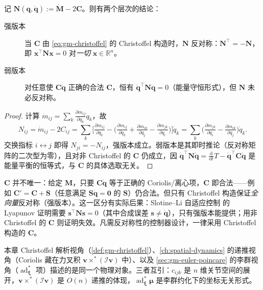 \begin{theorem}\label{thm:gm-skew}
记 $\mathbf N(\mathbf q,\dot{\mathbf q}):=\dot{\mathbf M}-2\mathbf C$。则有两个层次的结论：
\begin{description}
  \item[强版本] 当 $\mathbf C$ 由 \cref{eq:gm-christoffel} 的 Christoffel 构造时，$\mathbf N$ 反对称：$\mathbf N^\top=-\mathbf N$，即 $\mathbf x^\top\mathbf N\mathbf x=0$ 对\emph{一切} $\mathbf x\in\mathbb R^n$。
  \item[弱版本] 对任意使 $\mathbf C\dot{\mathbf q}$ 正确的合法 $\mathbf C$，恒有 $\dot{\mathbf q}^\top\mathbf N\dot{\mathbf q}=0$（能量守恒形式），但 $\mathbf N$ 未必反对称。
\end{description}
\end{theorem}

\begin{proof}
计算 $\dot m_{ij}=\sum_k\tfrac{\partial m_{ij}}{\partial q_k}\dot q_k$，故
\[
N_{ij}=\dot m_{ij}-2C_{ij}=\sum_k\Big[\tfrac{\partial m_{ij}}{\partial q_k}-\big(\tfrac{\partial m_{ij}}{\partial q_k}+\tfrac{\partial m_{ik}}{\partial q_j}-\tfrac{\partial m_{jk}}{\partial q_i}\big)\Big]\dot q_k=\sum_k\Big(\tfrac{\partial m_{jk}}{\partial q_i}-\tfrac{\partial m_{ik}}{\partial q_j}\Big)\dot q_k.
\]
交换指标 $i\leftrightarrow j$ 即得 $N_{ji}=-N_{ij}$，强版本成立。弱版本是其即时推论（反对称矩阵的二次型为零），且对非 Christoffel 的 $\mathbf C$ 仍成立，因 $\dot{\mathbf q}^\top\mathbf N\dot{\mathbf q}=\tfrac{\mathrm d}{\mathrm dt}T-\dot{\mathbf q}^\top\mathbf C\dot{\mathbf q}$ 是能量平衡的恒等式，与 $\mathbf C$ 的具体选取无关。
\end{proof}

\begin{pitfall}
$\mathbf C$ 并不唯一：给定 $\mathbf M$，只要 $\mathbf C\dot{\mathbf q}$ 等于正确的 Coriolis/离心项，$\mathbf C$ 即合法——例如 $\mathbf C'=\mathbf C+\mathbf S$（任意满足 $\mathbf S\dot{\mathbf q}=\mathbf0$ 的 $\mathbf S$）仍合法。但只有 Christoffel 构造保证\emph{全向量}反对称（强版本）。这一区分有实际后果：Slotine--Li 自适应控制\cite{slotine1987adaptive} 的 Lyapunov 证明需要 $\mathbf s^\top\mathbf N\mathbf s=0$（其中合成误差 $\mathbf s\ne\dot{\mathbf q}$），只有强版本能提供；用非 Christoffel 的 $\mathbf C$ 则证明失效。凡需反对称性的控制器设计，一律采用 Christoffel 构造的 $\mathbf C$。
\end{pitfall}

\begin{remark}
本章 Christoffel 解析视角（\cref{def:gm-christoffel}）、\cref{ch:spatial-dynamics} 的递推视角（Coriolis 藏在力叉积 $\mathbf v\times^*(\boldsymbol{\mathcal I}\mathbf v)$ 中）、以及 \cref{sec:gm-euler-poincare} 的李群视角（$\operatorname{ad}^*_{\boldsymbol\xi}$ 项）描述的是同一个物理对象。三者互引：$c_{ijk}$ 是 $n$ 维关节空间的展开，$\mathbf v\times^*(\boldsymbol{\mathcal I}\mathbf v)$ 是 $O(n)$ 递推的体现，$\operatorname{ad}^*_{\boldsymbol\xi}\boldsymbol\mu$ 是李群约化下的坐标无关形式。
\end{remark}

